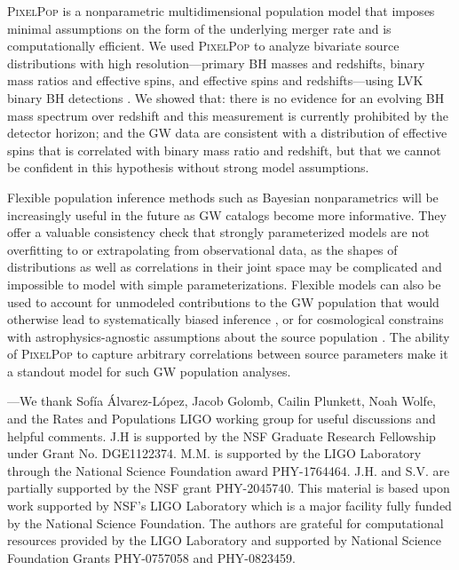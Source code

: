 \begin{refsection}
\textsc{PixelPop} \cite{Heinzel:2024jlc} is a nonparametric multidimensional population model that imposes minimal assumptions on the form of the underlying merger rate and is computationally efficient. We used \textsc{PixelPop} to analyze bivariate source distributions with high resolution---primary BH masses and redshifts, binary mass ratios and effective spins, and effective spins and redshifts---using LVK binary BH detections \cite{LIGOScientific:2018mvr, LIGOScientific:2020ibl, LIGOScientific:2021usb, LIGOScientific:2021djp}. We showed that: there is no evidence for an evolving BH mass spectrum over redshift and this measurement is currently prohibited by the detector horizon; and the GW data are consistent with a distribution of effective spins that is correlated with binary mass ratio and redshift, but that we cannot be confident in this hypothesis without strong model assumptions.

Flexible population inference methods such as Bayesian nonparametrics will be increasingly useful in the future as GW catalogs become more informative. They offer a valuable consistency check that strongly parameterized models are not overfitting to or extrapolating from observational data, as the shapes of distributions as well as correlations in their joint space may be complicated and impossible to model with simple parameterizations. Flexible models can also be used to account for unmodeled contributions to the GW population that would otherwise lead to systematically biased inference \cite{Cheng:2023ddt}, or for cosmological constrains with astrophysics-agnostic assumptions about the source population \cite{MaganaHernandez:2024uty, Farah:2024xub}. The ability of \textsc{PixelPop} to capture arbitrary correlations between source parameters make it a standout model for such GW population analyses.

---We thank Sofía Álvarez-López, Jacob Golomb, Cailin Plunkett, Noah Wolfe, and the Rates and Populations LIGO working group for useful discussions and helpful comments.
%
J.H is supported by the NSF Graduate Research Fellowship under Grant No. DGE1122374.
%
M.M. is supported by the LIGO Laboratory through the National Science Foundation award PHY-1764464.
%
J.H. and S.V. are partially supported by the NSF grant PHY-2045740.
%
This material is based upon work supported by NSF's LIGO Laboratory which is a major facility fully funded by the National Science Foundation.
%
The authors are grateful for computational resources provided by the LIGO Laboratory and supported by National Science Foundation Grants PHY-0757058 and PHY-0823459.


\end{refsection}
